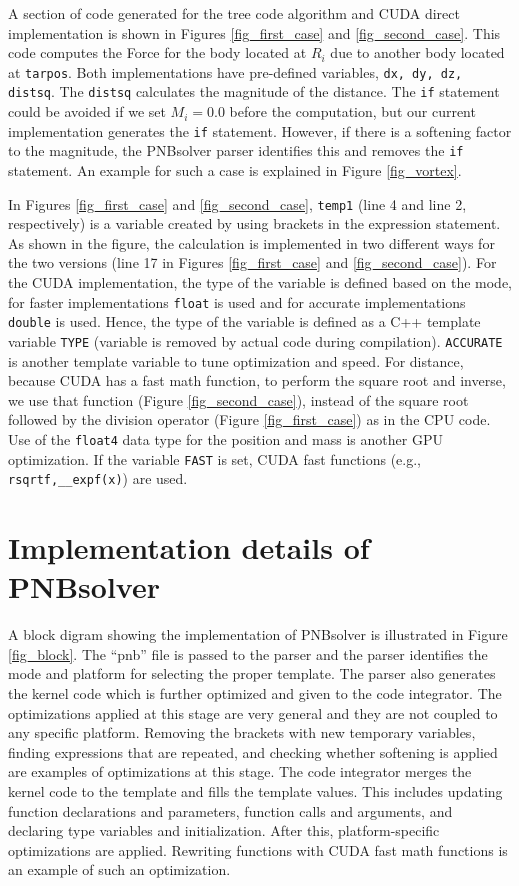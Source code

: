 \documentclass[draftclsnofoot]{elsarticle}
\begin{document}
A section of code generated for the tree code algorithm and CUDA direct implementation is shown in  Figures \ref{fig_first_case} and \ref{fig_second_case}. This code computes the Force 
for the body located at $R_i$ due to another body located at \texttt{tarpos}. Both  implementations have  pre-defined variables, \texttt{dx, dy, dz, distsq}. 
The \texttt{distsq} calculates the magnitude of the distance. The \texttt{if} statement could be avoided if we set $M_i=0.0$ before the computation, but our 
current implementation generates the \texttt{if} statement. However, if there is a softening factor to the magnitude, the PNBsolver parser identifies this and 
removes the \texttt{if} statement. An example for such a case is explained in Figure \ref{fig_vortex}. 
 
In  Figures \ref{fig_first_case} and \ref{fig_second_case}, \texttt{temp1} (line 4 and line 2, respectively)  is a variable created by using brackets in the expression statement. 
As shown in the figure, the calculation is implemented in two different  ways for the two versions (line 17 in Figures \ref{fig_first_case} and \ref{fig_second_case}). For the 
CUDA implementation, the type of the variable is 
defined based on the mode, for faster implementations \texttt{float} is used and for accurate implementations \texttt{double}  is used. Hence, the type of the variable is 
defined as a C++ template variable \texttt{TYPE} (variable is removed by actual code during compilation). \texttt{ACCURATE} is another template variable to tune 
optimization and speed. For distance, because CUDA has a fast math function, 
to perform the square root and inverse, we use that function (Figure \ref{fig_second_case}), instead of the square root followed by the division operator (Figure \ref{fig_first_case}) 
as in the CPU code. Use of the \texttt{float4} data type for the position and mass is another GPU optimization. If the variable \texttt{FAST} is set,
 CUDA fast functions (e.g., \texttt{rsqrtf,\_\_expf(x)}) are used. 


\section{Implementation details of PNBsolver}
\label{implementation}

A block digram showing the implementation of PNBsolver is illustrated in Figure \ref{fig_block}. The ``pnb'' file is passed to the parser and the parser identifies the  mode and platform
for selecting the proper template. The parser also generates the kernel code which is further optimized and given to the code integrator. The optimizations applied  at this stage are 
very general and they are  not coupled to any specific platform. Removing the brackets with new temporary variables, finding expressions that are repeated, 
and checking whether softening is applied are examples of optimizations at this stage.  The code integrator merges the kernel code to the template and 
fills the template values. This includes updating function declarations and parameters, function calls and arguments, and declaring type variables 
and initialization. After this, platform-specific optimizations are applied. Rewriting functions with CUDA fast math functions is an example of 
such an optimization. 
\end{document}
